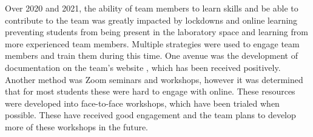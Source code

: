 \documentclass[runningheads]{llncs}
\begin{document}
Over 2020 and 2021, the ability of team members to learn skills and be able to contribute to the team was greatly impacted by lockdowns and online learning preventing students from being present in the laboratory space and learning from more experienced team members. Multiple strategies were used to engage team members and train them during this time. One avenue was the development of documentation on the team's website \cite{nubotsNUbookGit}, which has been received positively. Another method was Zoom seminars and workshops, however it was determined that for most students these were hard to engage with online. These resources were developed into face-to-face workshops, which have been trialed when possible. These have received good engagement and the team plans to develop more of these workshops in the future.

%
%
%


\end{document}
